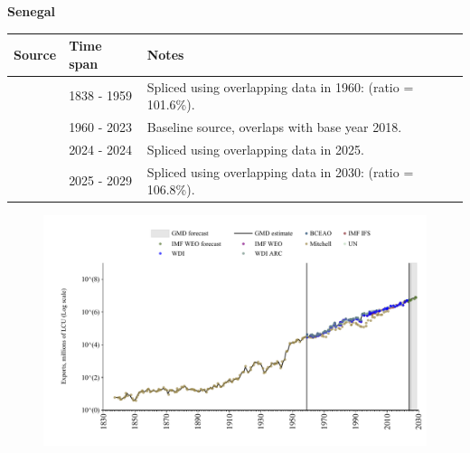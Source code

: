 \documentclass[12pt,a4paper,landscape]{article}
\begin{document}
\begin{adjustbox}{max totalsize={\paperwidth}{\paperheight},center}
\begin{minipage}[t][\textheight][t]{\textwidth}
\vspace*{0.5cm}
{}
\begin{center}
{\Large\bfseries Senegal}
\end{center}
\vspace{0.5cm}
\begin{table}[H]
\centering
\small
\begin{tabular}{|l|l|l|}
\hline
\textbf{Source} & \textbf{Time span} & \textbf{Notes} \\
\hline
\rowcolor{white}\cite{Mitchell}& 1838 - 1959 &Spliced using overlapping data in 1960: (ratio = 101.6\%).\\
\rowcolor{lightgray}\cite{WDI}& 1960 - 2023 &Baseline source, overlaps with base year 2018.\\
\rowcolor{white}\cite{BCEAO}& 2024 - 2024 &Spliced using overlapping data in 2025.\\
\rowcolor{lightgray}\cite{IMF_WEO_forecast}& 2025 - 2029 &Spliced using overlapping data in 2030: (ratio = 106.8\%).\\
\hline
\end{tabular}
\end{table}
\begin{figure}[H]
\centering
\includegraphics[width=\textwidth,height=0.6\textheight,keepaspectratio]{graphs/SEN_exports.pdf}
\end{figure}
\end{minipage}
\end{adjustbox}
\end{document}
